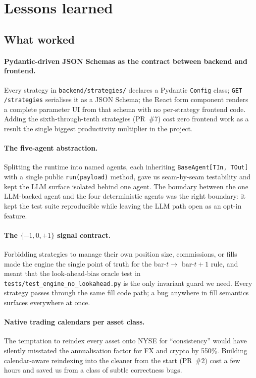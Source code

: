 \section{Lessons learned}
\label{sec:lessons}

\subsection{What worked}

\paragraph{Pydantic-driven JSON Schemas as the contract between backend and frontend.}
Every strategy in \texttt{backend/strategies/} declares a Pydantic \texttt{Config}
class; \texttt{GET /strategies} serialises it as a JSON Schema; the React form
component renders a complete parameter UI from that schema with no per-strategy
frontend code. Adding the sixth-through-tenth strategies (PR~\#7) cost zero
frontend work as a result \textemdash{} the single biggest productivity
multiplier in the project.

\paragraph{The five-agent abstraction.} Splitting the runtime into named agents,
each inheriting \texttt{BaseAgent[TIn, TOut]} with a single public
\texttt{run(payload)} method, gave us seam-by-seam testability and kept the LLM
surface isolated behind one agent. The boundary between the one LLM-backed
agent and the four deterministic agents was the right boundary: it kept the test
suite reproducible while leaving the LLM path open as an opt-in feature.

\paragraph{The $\{-1, 0, +1\}$ signal contract.} Forbidding strategies to manage
their own position size, commissions, or fills made the engine the single point of
truth for the bar-$t \to$ bar-$t{+}1$ rule, and meant that the
look-ahead-bias oracle test in \texttt{tests/test\_engine\_no\_lookahead.py} is the
only invariant guard we need. Every strategy passes through the same fill code
path; a bug anywhere in fill semantics surfaces everywhere at once.

\paragraph{Native trading calendars per asset class.} The temptation to reindex
every asset onto NYSE for ``consistency'' would have silently misstated the
annualisation factor for FX and crypto by 5\textendash{}50\%. Building
calendar-aware reindexing into the cleaner from the start (PR~\#2) cost a few
hours and saved us from a class of subtle correctness bugs.

